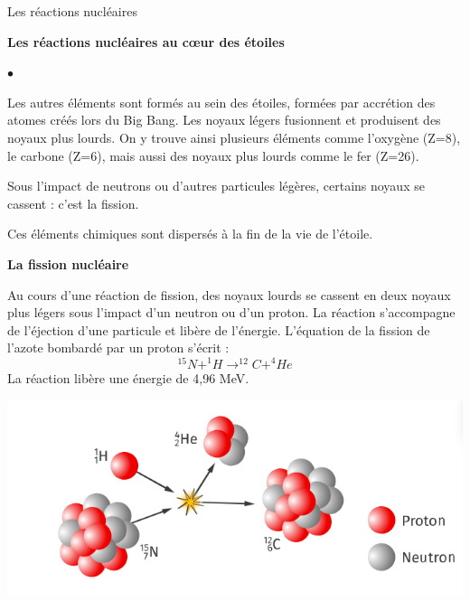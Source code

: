 \documentclass[24pt]{article}
\begin{document}
\begin{concept}{Les réactions nucléaires}
    \begin{center}
        \textbf{Les réactions nucléaires au cœur des étoiles}
    \end{center}

    \begin{list}{$\bullet$}{}
        \item Les autres éléments sont formés au sein des étoiles, formées par accrétion des
              atomes créés lors du Big Bang.
              Les noyaux légers fusionnent et produisent des noyaux plus lourds.
              On y trouve ainsi plusieurs éléments comme l’oxygène (Z=8), le carbone (Z=6),
              mais aussi des noyaux plus lourds comme le fer (Z=26).

        \item Sous l’impact de neutrons ou d’autres particules légères, certains noyaux se
              cassent : c’est la fission.

        \item Ces éléments chimiques sont dispersés à la fin de la vie de l’étoile.
    \end{list}

    \begin{center}
        \textbf{La fission nucléaire}
    \end{center}

    Au cours d’une réaction de fission, des noyaux lourds se cassent en deux noyaux
    plus légers sous l’impact d’un neutron ou d'un proton.
    La réaction s’accompagne de l’éjection d’une particule et libère de l’énergie.
    L’équation de la fission de l’azote bombardé par un proton s’écrit :
    $$^{15}N + ^1H \rightarrow ^{12}C + ^4He$$
    La réaction libère une énergie de 4,96 MeV.

    \begin{center}
        \includegraphics[width=0.4\columnwidth]{nuclear2.png}
    \end{center}

\end{concept}
\end{document}
